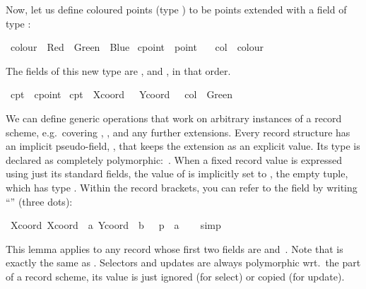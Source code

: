 \begin{isabellebody}
\begin{isamarkuptext}
  Now, let us define coloured points (type ) to be
  points extended with a field  of type :%
\end{isamarkuptext}%
\isamarkuptrue%
\isamarkupfalse%
\ colour\ {\isacharequal}\ Red\ {\isacharbar}\ Green\ {\isacharbar}\ Blue\isanewline
\isanewline
{}\isamarkupfalse%
\ cpoint\ {\isacharequal}\ point\ {\isacharplus}\isanewline
\ \ col\ {\isacharcolon}{\isacharcolon}\ colour%
\begin{isamarkuptext}%
\noindent
  The fields of this new type are ,  and
  , in that order.%
\end{isamarkuptext}%
\isamarkuptrue%
\isamarkupfalse%
\ cpt{}\ {\isacharcolon}{\isacharcolon}\ cpoint\ \isanewline
{\isachardoublequoteopen}cpt{}\ {\isasymequiv}\ {\isasymlparr}Xcoord\ {\isacharequal}\ {}{}{}{\isacharcomma}\ Ycoord\ {\isacharequal}\ {}{}{\isacharcomma}\ col\ {\isacharequal}\ Green{\isasymrparr}{\isachardoublequoteclose}%
\begin{isamarkuptext}%
We can define generic operations that work on arbitrary
  instances of a record scheme, e.g.\ covering , , and any further extensions.  Every record structure has an
  implicit pseudo-field, , that keeps the extension as an
  explicit value.  Its type is declared as completely
  polymorphic:~.  When a fixed record value is expressed
  using just its standard fields, the value of  is
  implicitly set to \isa{{\isacharparenleft}{\isacharparenright}}, the empty tuple, which has type
  .  Within the record brackets, you can refer to the
   field by writing ``\isa{{\isasymdots}}'' (three dots):%
\end{isamarkuptext}%
\isamarkuptrue%
\isamarkupfalse%
\ {\isachardoublequoteopen}Xcoord\ {\isasymlparr}Xcoord\ {\isacharequal}\ a{\isacharcomma}\ Ycoord\ {\isacharequal}\ b{\isacharcomma}\ {\isasymdots}\ {\isacharequal}\ p{\isasymrparr}\ {\isacharequal}\ a{\isachardoublequoteclose}\isanewline
%
\isadelimproof
\ \ %
\endisadelimproof
%
\isatagproof
{}\isamarkupfalse%
\ simp%
\endisatagproof
{\isafoldproof}%
%
\isadelimproof
%
\endisadelimproof
%
\begin{isamarkuptext}%
This lemma applies to any record whose first two fields are  and~.  Note that  is exactly the same as .  Selectors and updates are always polymorphic wrt.\ the
   part of a record scheme, its value is just ignored (for
  select) or copied (for update).


\end{isamarkuptext}
\end{isabellebody}
